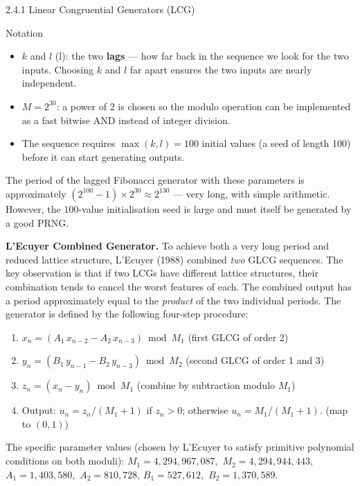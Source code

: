 \documentclass[aspectratio=169,10pt]{beamer}
\begin{document}
\begin{frame}[allowframebreaks]{2.4.1 Linear Congruential Generators (LCG)}
\begin{block}{Notation}
\begin{itemize}
  \item $k$ and $l$ (l): the two \textbf{lags} --- how far back in the
    sequence we look for the two inputs.  Choosing $k$ and $l$ far apart
    ensures the two inputs are nearly independent.
  \item $M = 2^{30}$: a power of 2 is chosen so the modulo operation can
    be implemented as a fast bitwise AND instead of integer division.
  \item The sequence requires $\max(k,l) = 100$ initial values (a seed
    of length 100) before it can start generating outputs.
\end{itemize}
The period of the lagged Fibonacci generator with these parameters is
approximately $(2^{100} - 1) \times 2^{30} \approx 2^{130}$ --- very long,
with simple arithmetic.  However, the $100$-value initialisation seed is
large and must itself be generated by a good PRNG.
\end{block}

\medskip
\textbf{L'Ecuyer Combined Generator.}
To achieve both a very long period and reduced lattice structure,
L'Ecuyer (1988) combined \emph{two} GLCG sequences.  The key observation is
that if two LCGs have different lattice structures, their combination tends
to cancel the worst features of each.  The combined output has a period
approximately equal to the \emph{product} of the two individual periods.
The generator is defined by the following four-step procedure:

\begin{enumerate}
  \item $x_n = (A_1\,x_{n-2} - A_2\,x_{n-3}) \bmod M_1$
    \hfill (first GLCG of order 2)
  \item $y_n = (B_1\,y_{n-1} - B_2\,y_{n-3}) \bmod M_2$
    \hfill (second GLCG of order 1 and 3)
  \item $z_n = (x_n - y_n) \bmod M_1$
    \hfill (combine by subtraction modulo $M_1$)
  \item Output: $u_n = z_n/(M_1+1)$ if $z_n > 0$; otherwise
    $u_n = M_1/(M_1+1)$.
    \hfill (map to $(0,1)$)
\end{enumerate}

The specific parameter values (chosen by L'Ecuyer to satisfy primitive
polynomial conditions on both moduli):
$M_1 = 4{,}294{,}967{,}087$,\ $M_2 = 4{,}294{,}944{,}443$,
$A_1 = 1{,}403{,}580$,\ $A_2 = 810{,}728$,
$B_1 = 527{,}612$,\ $B_2 = 1{,}370{,}589$.


\end{frame}
\end{document}
